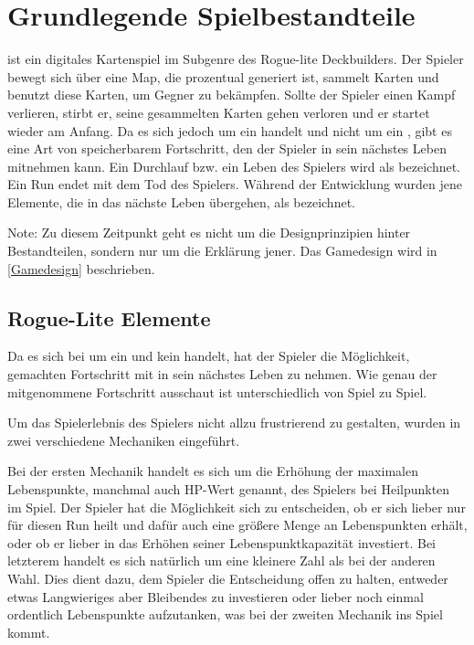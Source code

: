 
\section{Grundlegende Spielbestandteile}\label{sec:grundlegenste-regeln}

\renewcommand{\kapitelautor}{Autor: Philip Jankovic}





%
\FF ist ein digitales Kartenspiel im Subgenre des Rogue-lite Deckbuilders.
Der Spieler bewegt sich über eine Map, die prozentual generiert ist, sammelt Karten und benutzt diese Karten,
um Gegner zu bekämpfen. Sollte der Spieler einen Kampf verlieren, stirbt er, seine gesammelten Karten
gehen verloren und er startet wieder am Anfang. Da es sich jedoch um ein  handelt und nicht um ein ,
gibt es eine Art von speicherbarem Fortschritt, den der Spieler in sein nächstes Leben mitnehmen kann.
Ein Durchlauf bzw. ein Leben des Spielers wird als  bezeichnet. Ein Run endet mit dem Tod des Spielers.
Während der Entwicklung wurden jene Elemente, die in das nächste Leben übergehen, als  bezeichnet.



\begin{infoBox}
    Note: Zu diesem Zeitpunkt geht es nicht um die Designprinzipien hinter Bestandteilen,
    sondern nur um die Erklärung jener. Das Gamedesign wird in \ref{Gamedesign} beschrieben.
\end{infoBox}


\subsection{Rogue-Lite Elemente}\label{rogue_lite_elemente}

Da es sich bei \FF um ein  und kein  handelt, hat der Spieler die Möglichkeit, gemachten Fortschritt mit in sein nächstes Leben zu nehmen.
Wie genau der mitgenommene Fortschritt ausschaut ist unterschiedlich von Spiel zu Spiel.


Um das Spielerlebnis des Spielers nicht allzu frustrierend zu gestalten, wurden in \FF zwei verschiedene Mechaniken eingeführt.


Bei der ersten Mechanik handelt es sich um die Erhöhung der maximalen Lebenspunkte, manchmal auch HP-Wert genannt, des Spielers bei Heilpunkten im Spiel.
Der Spieler hat die Möglichkeit sich zu entscheiden, ob er sich lieber nur für diesen Run heilt und dafür auch eine größere Menge an Lebenspunkten erhält, oder ob er
lieber in das Erhöhen seiner Lebenspunktkapazität investiert. Bei letzterem handelt es sich natürlich um eine kleinere Zahl als bei der anderen Wahl.
Dies dient dazu, dem Spieler die Entscheidung offen zu halten, entweder etwas Langwieriges aber Bleibendes zu investieren oder lieber noch einmal ordentlich
Lebenspunkte aufzutanken, was bei der zweiten Mechanik ins Spiel kommt.

